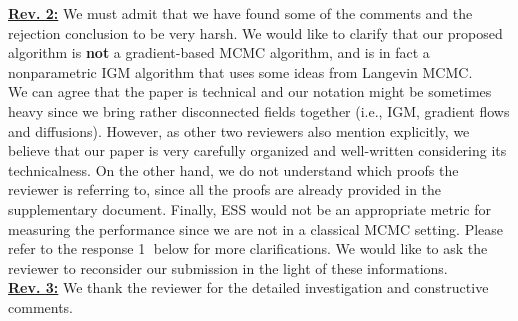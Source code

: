 \documentclass{article}
\newcommand{\rev}[1]{{\color{red} #1}}
\newcommand{\umut}[1]{{\color{blue} #1}}
\newcommand{\ubul}[1]{{\large \color{red} \textcircled{\small #1}}}
\begin{document}
%
\textbf{\color{red} \underline{Rev. 2:}}
%
We must admit that we have found some of the comments and the rejection conclusion to be very harsh. We would like to clarify that our proposed algorithm is \textbf{not} a gradient-based MCMC algorithm, and is in fact a nonparametric IGM algorithm that uses some ideas from Langevin MCMC. \\
%
We can agree that the paper is technical and our notation might be sometimes heavy since we bring rather disconnected fields together (i.e., IGM, gradient flows and diffusions). However, as other two reviewers also mention explicitly, we believe that our paper is very carefully organized and well-written considering its technicalness. On the other hand, we do not understand which proofs the reviewer is referring to, since all the proofs are already provided in the supplementary document. Finally, ESS would not be an appropriate metric for measuring the performance since we are not in a classical MCMC setting. Please refer to the response \ubul{1} below for more clarifications. We would like to ask the reviewer to reconsider our submission in the light of these informations.  \vspace{2pt} \\
% 
%
\textbf{\color{red} \underline{Rev. 3:}}
%
We thank the reviewer for the detailed investigation and constructive comments. %
%
\end{document}
